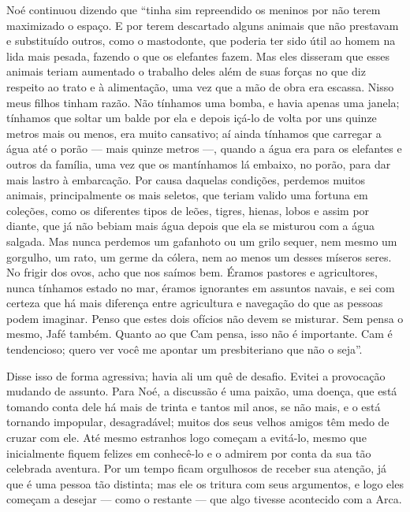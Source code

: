 Noé continuou dizendo que “tinha sim repreendido os meninos por não terem
maximizado o espaço. E por terem descartado alguns animais que não
prestavam e substituído outros, como o mastodonte, que poderia ter sido útil ao
homem na lida mais pesada, fazendo o que os elefantes fazem. Mas eles disseram que
esses animais teriam aumentado o trabalho deles além de suas forças no que diz
respeito ao trato e à alimentação, uma vez que a mão de obra era escassa.
Nisso meus filhos tinham razão. Não tínhamos uma bomba, e havia apenas uma janela;
tínhamos que soltar um balde por ela e depois içá-lo de volta por uns quinze metros
mais ou menos, era muito cansativo; aí ainda tínhamos que carregar a
água até o porão --- mais quinze metros ---, quando a água era para os elefantes e
outros da família, uma vez que os mantínhamos lá embaixo, no porão, para dar mais
lastro à embarcação. Por causa daquelas condições, perdemos muitos animais,
principalmente os mais seletos, que teriam valido uma fortuna em coleções, como os
diferentes tipos de leões, tigres, hienas, lobos e assim por diante, que já não
bebiam mais água depois que ela se misturou com a água salgada. Mas nunca
perdemos um gafanhoto ou um grilo sequer, nem mesmo um gorgulho, um rato, um germe
da cólera, nem ao menos um desses míseros seres. No frigir dos ovos, acho que nos
saímos bem. Éramos pastores e agricultores, nunca tínhamos estado no mar,
éramos ignorantes em assuntos navais, e sei com certeza que há mais
diferença entre agricultura e navegação do que as pessoas podem imaginar. Penso que
estes dois ofícios não devem se misturar. Sem pensa o mesmo, Jafé
também. Quanto ao que Cam pensa, isso não é importante. Cam é tendencioso; 
quero ver você me apontar um presbiteriano que não o seja”.     

Disse isso de forma agressiva; havia ali um quê de desafio. Evitei a
provocação mudando de assunto. Para Noé, a discussão é uma paixão, uma doença, que
está tomando conta dele há mais de trinta e tantos mil anos, se não mais, e o está
tornando impopular, desagradável; muitos dos seus velhos amigos têm medo de
cruzar com ele. Até mesmo estranhos logo começam a evitá-lo, mesmo que
inicialmente fiquem felizes em conhecê-lo e o admirem por conta da sua tão
celebrada aventura. Por um tempo ficam orgulhosos de receber sua atenção, já que
é uma pessoa tão distinta; mas ele os tritura com seus argumentos, e logo eles começam
a desejar --- como o restante --- que algo tivesse acontecido com a Arca.

\sectionitem

